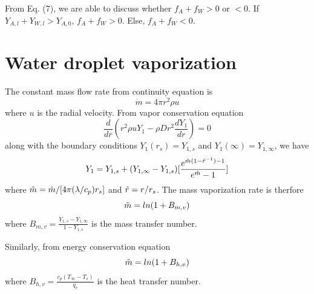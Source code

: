 \documentclass{article}
\begin{document}
From Eq. (7), we are able to discuss whether $f_A+f_W>0$ or $<0$. If $Y_{A,l}+Y_{W,l}>Y_{A,0}$, $f_A+f_W>0$. Else, $f_A+f_W<0$.



\section{Water droplet vaporization}
The constant mass flow rate from continuity equation is
\begin{equation}
    \dot{m}=4\pi r^2 \rho u
\end{equation}
where $u$ is the radial velocity. From vapor conservation equation
\begin{equation}
    \frac{d}{dr}(r^2\rho u Y_1-\rho Dr^2\frac{dY_1}{dr})=0
\end{equation}
along with the boundary conditions $Y_1(r_s)=Y_{1,s}$ and $Y_1(\infty)=Y_{1,\infty}$, we have
\begin{equation}
    Y_1 = Y_{1,s}+(Y_{1,\infty}-Y_{1,s})[\frac{e^{\Tilde{m}(1-\Tilde{r}^{-1})-1}}{e^{\Tilde{m}}-1}]
\end{equation}
where $\Tilde{m}=\dot{m}/[4\pi (\lambda /c_p)r_s]$ and $\Tilde{r}=r/r_s$.
The mass vaporization rate is therfore
\begin{equation}
    \Tilde{m}=ln(1+B_{m,v})
\end{equation}
where $B_{m,v}=\frac{Y_{1,s}-Y_{1,\infty}}{1-Y_{1,s}}$ is the mass transfer number.

Similarly, from energy conservation equation
\begin{equation}
    \Tilde{m}=ln(1+B_{h,v})
\end{equation}
where $B_{h,v}=\frac{c_p(T_\infty - T_s)}{q_v}$ is the heat transfer number.
\end{document}
